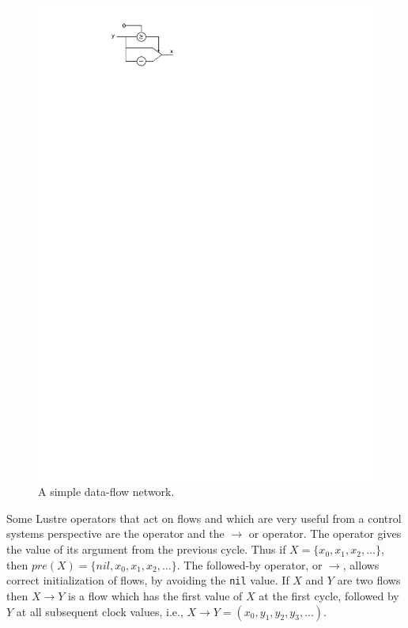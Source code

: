 \begin{figure}
\centering
\includegraphics{figs/scade_eq}
\caption{A simple data-flow network.}
\label{fig:scade_eq}
\end{figure}

Some Lustre operators that act on flows and which are very useful from
a control systems perspective are the  operator and the $\to$
or  operator. The  operator gives the value of its
argument from the previous cycle. Thus if $X = \{x_0, x_1, x_2,
  \ldots\}$, then $pre(X) = \{nil, x_0, x_1, x_2, \ldots\}$. The
    followed-by operator,  or $\to$, allows correct
    initialization of flows, by avoiding the \texttt{nil} value. If
    $X$ and $Y$ are two flows then $X \to Y$ is a flow which has the
    first value of $X$ at the first cycle, followed by $Y$ at all
    subsequent clock values, i.e., $X \to Y = (x_0, y_1, y_2, y_3,
    ...)$.

